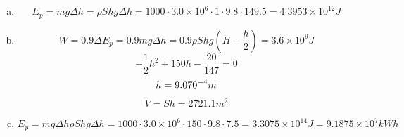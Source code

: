 \documentclass{article}
\begin{document}
\section{}
\begin{enumerate}[(a)]
	\item
	$$E_p=mg\Delta h=\rho Shg\Delta h=1000\cdot3.0\times10^6\cdot1\cdot9.8\cdot149.5=4.3953\times10^{12}J$$
	\item
	$$W=0.9\Delta E_p=0.9mg\Delta h=0.9\rho Shg(H-\frac{h}{2})=3.6\times10^9J$$
	$$-\frac{1}{2}h^2+150h-\frac{20}{147}=0$$
	$$h=9.070\time10^{-4}m$$
	$$V=Sh=2721.1m^2$$
	\item
	$$E_p=mg\Delta h\rho Shg\Delta  h=1000\cdot3.0\times10^6\cdot150\cdot9.8\cdot7.5=3.3075\times10^{14}J=9.1875\times10^{7}kWh$$
\end{enumerate}
\end{document}
